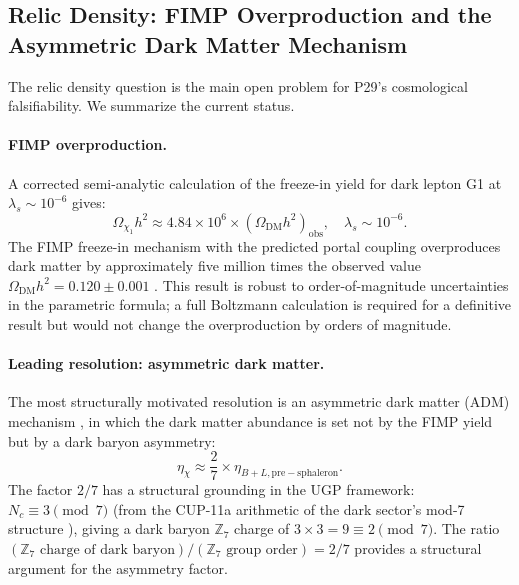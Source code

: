\documentclass[11pt]{article}
\begin{document}
\subsection{Relic Density: FIMP Overproduction and the Asymmetric Dark Matter Mechanism}
\label{ssec:relic_density}

The relic density question is the main open problem for P29's cosmological falsifiability.
We summarize the current status.

\paragraph{FIMP overproduction.}
A corrected semi-analytic calculation of the freeze-in yield for dark lepton G1 at
$\lambda_s \sim 10^{-6}$ gives:
\begin{equation}
\Omega_{\chi_1} h^2 \approx 4.84 \times 10^6 \times (\Omega_\mathrm{DM} h^2)_\mathrm{obs},
\quad \lambda_s \sim 10^{-6}.
\label{eq:fimp_overproduction}
\end{equation}
The FIMP freeze-in mechanism with the predicted portal coupling overproduces dark matter
by approximately five million times the observed value $\Omega_\mathrm{DM} h^2 = 0.120 \pm 0.001$
\cite{Planck2018}. This result is robust to order-of-magnitude uncertainties in the
parametric formula; a full Boltzmann calculation is required for a definitive result but
would not change the overproduction by orders of magnitude.

\paragraph{Leading resolution: asymmetric dark matter.}
The most structurally motivated resolution is an asymmetric dark matter (ADM) mechanism
\cite{KaplanLutyZurek2009}, in which the dark matter abundance is set not by
the FIMP yield but by a dark baryon asymmetry:
\begin{equation}
\eta_\chi \approx \frac{2}{7} \times \eta_{B+L,\mathrm{pre-sphaleron}}.
\label{eq:adm_formula}
\end{equation}
The factor $2/7$ has a structural grounding in the UGP framework: $N_c \equiv 3\pmod{7}$
(from the CUP-11a arithmetic of the dark sector's mod-7 structure
\cite{SpivackCompUniversality}), giving a dark baryon $\mathbb{Z}_7$ charge of
$3\times3=9\equiv 2\pmod{7}$. The ratio $(\mathbb{Z}_7\text{ charge of dark baryon}) /
(\mathbb{Z}_7\text{ group order}) = 2/7$ provides a structural argument for the
asymmetry factor.
\end{document}
